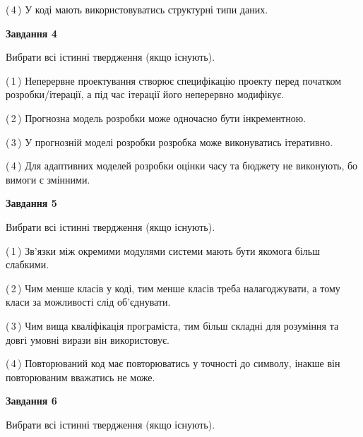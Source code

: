 \documentclass[10pt, ukrainian]{article}
\begin{document}
{\begin {large}
(\,4\,) У коді мають використовуватись структурні типи даних. %


{\begin {center}\textbf{Завдання 4}\end {center}}\par
Вибрати всі істинні твердження (якщо існують).\par
\vspace{2mm}



(\,1\,) Неперервне проектування створює специфікацію проекту перед початком розробки/ітерації, а під час ітерації його неперервно модифікує.%



(\,2\,) Прогнозна модель розробки може одночасно бути інкрементною. %



(\,3\,) У прогнозній моделі розробки розробка може виконуватись ітеративно. %



(\,4\,) Для адаптивних моделей розробки оцінки часу та бюджету не виконують, бо вимоги є змінними. %


{\begin {center}\textbf{Завдання 5}\end {center}}\par
Вибрати всі істинні твердження (якщо існують).\par
\vspace{2mm}



(\,1\,) Зв'язки між окремими модулями системи мають бути якомога більш слабкими. %



(\,2\,) Чим менше класів у коді, тим менше класів треба налагоджувати, а тому класи за можливості слід об'єднувати. %



(\,3\,) Чим вища кваліфікація програміста, тим більш складні для розуміння та довгі умовні вирази він використовує. %



(\,4\,) Повторюваний код має повторюватись у точності до символу, інакше він повторюваним вважатись не може. %

\newpage

{\begin {center}\textbf{Завдання 6}\end {center}}\par
Вибрати всі істинні твердження (якщо існують).\par
\vspace{2mm}




\end{large}}
\end{document}

